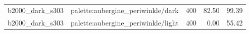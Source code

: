 \begin{longtable}{l>{\raggedright\arraybackslash}p{.42\linewidth}rrr}
b2000\_\allowbreak{}dark\_\allowbreak{}s303 & %
palette:aubergine\_\allowbreak{}periwinkle/dark & %
400 & %
82.50 & %
99.39 \\ %

b2000\_\allowbreak{}dark\_\allowbreak{}s303 & %
palette:aubergine\_\allowbreak{}periwinkle/light & %
400 & %
0.00 & %
55.42 \\ %


\end{longtable}
